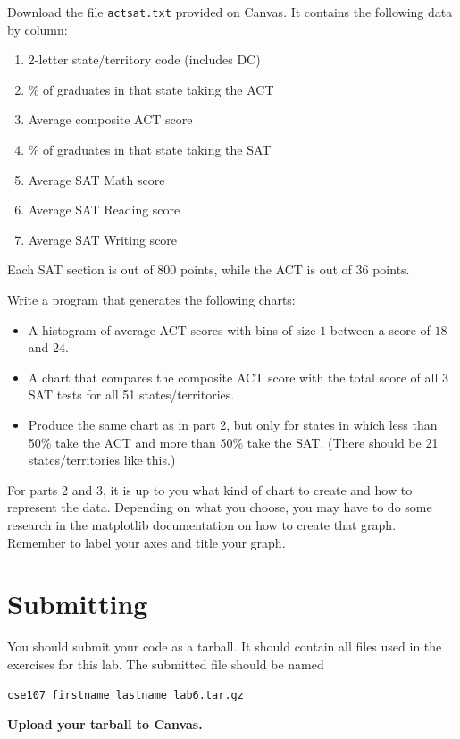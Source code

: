 \documentclass[11pt]{cselabheader}
\begin{document}
  \begin{ex}[testscores.py]
    Download the file \texttt{actsat.txt} provided on Canvas. It contains the
    following data by column:

    \begin{enumerate}
      \item 2-letter state/territory code (includes DC)
      \item \% of graduates in that state taking the ACT
      \item Average composite ACT score
      \item \% of graduates in that state taking the SAT
      \item Average SAT Math score
      \item Average SAT Reading score
      \item Average SAT Writing score
    \end{enumerate}

    Each SAT section is out of 800 points, while the ACT is out of 36 points.

    Write a program that generates the following charts:
    \begin{itemize}
      \item A histogram of average ACT scores with bins of size $1$ between a
        score of $18$ and $24$.
      \item A chart that compares the composite ACT score with the total score
        of all 3 SAT tests for all 51 states/territories.
      \item Produce the same chart as in part 2, but only for states in which
        less than 50\% take the ACT and more than 50\% take the SAT. (There
        should be 21 states/territories like this.)
    \end{itemize}

    For parts 2 and 3, it is up to you what kind of chart to create and how to
    represent the data. Depending on what you choose, you may have to do some
    research in the matplotlib documentation on how to create that graph.
    Remember to label your axes and title your graph.
  \end{ex}


\section{Submitting}

You should submit your code as a tarball. It should contain all files
used in the exercises for this lab. The submitted file should be named
\begin{center}
  \texttt{cse107\_firstname\_lastname\_lab6.tar.gz}
\end{center}

\begin{center}
  \textbf{Upload your tarball to Canvas.}
\end{center}

\listoftheorems
\end{document}
